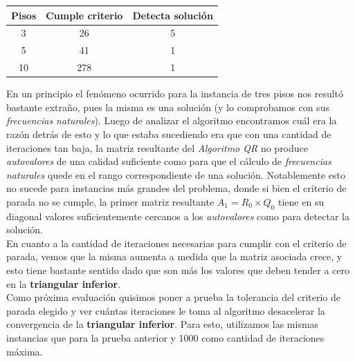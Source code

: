 \documentclass[a4paper]{article}
\begin{document}
\vspace{2em}
\begin{center}
\begin{tabular}{|c|c|c|}
  \hline
  Pisos & Cumple criterio & Detecta solución \\
  \hline
3   & 26 & 5  \\
5   & 41 & 1  \\
10 & 278 & 1 \\
\hline
\end{tabular}
\end{center}

En un principio el fenómeno ocurrido para la instancia de tres pisos nos resultó bastante extraño, pues la misma es una solución (y lo comprobamos con sus \textit{frecuencias naturales}). Luego de analizar el algoritmo encontramos cuál era la razón detrás de esto y lo que estaba sucediendo era que con una cantidad de iteraciones tan baja, la matriz resultante del \textit{Algoritmo QR} no produce \textit{autovalores} de una calidad suficiente como para que el cálculo de \textit{frecuencias naturales} quede en el rango correspondiente de una solución. Notablemente esto no sucede para instancias más grandes del problema, donde si bien el criterio de parada no se cumple, la primer matriz resultante $A_1 = R_0 \times Q_0$ tiene en su diagonal valores suficientemente cercanos a los \textit{autovalores} como para detectar la solución.\\

En cuanto a la cantidad de iteraciones necesarias para cumplir con el criterio de parada, vemos que la misma aumenta a medida que la matriz asociada crece, y esto tiene bastante sentido dado que son más los valores que deben tender a cero en la \textbf{triangular inferior}.\\

Como próxima evaluación quisimos poner a prueba la tolerancia del criterio de parada elegido y ver cuántas iteraciones le toma al algoritmo desacelerar la convergencia de la \textbf{triangular inferior}. Para esto, utilizamos las mismas instancias que para la prueba anterior y 1000 como cantidad de iteraciones máxima.\\
\end{document}
